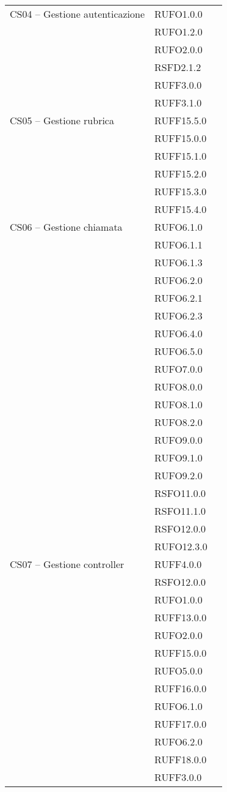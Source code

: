 \begin{center}
\begin{longtable}{lp{}l}
CS04 -- Gestione autenticazione & RUFO1.0.0 \\
 & RUFO1.2.0 \\
 & RUFO2.0.0 \\
 & RSFD2.1.2 \\
 & RUFF3.0.0 \\
 & RUFF3.1.0 \\
 
CS05 -- Gestione rubrica & RUFF15.5.0 \\
 & RUFF15.0.0 \\
 & RUFF15.1.0 \\
 & RUFF15.2.0 \\
 & RUFF15.3.0 \\
 & RUFF15.4.0 \\
 
CS06 -- Gestione chiamata
 & RUFO6.1.0 \\
 & RUFO6.1.1 \\
 & RUFO6.1.3 \\
 & RUFO6.2.0 \\
 & RUFO6.2.1 \\
 & RUFO6.2.3 \\
 & RUFO6.4.0 \\
 & RUFO6.5.0 \\
 & RUFO7.0.0 \\
 & RUFO8.0.0 \\
 & RUFO8.1.0 \\
 & RUFO8.2.0 \\
 & RUFO9.0.0 \\
 & RUFO9.1.0 \\
 & RUFO9.2.0 \\
 & RSFO11.0.0 \\
 & RSFO11.1.0 \\
 & RSFO12.0.0 \\
 & RUFO12.3.0 \\
 
CS07 -- Gestione controller & RUFF4.0.0 \\
 & RSFO12.0.0 \\
 & RUFO1.0.0 \\
 & RUFF13.0.0 \\
 & RUFO2.0.0 \\
 & RUFF15.0.0 \\
 & RUFO5.0.0 \\
 & RUFF16.0.0 \\
 & RUFO6.1.0 \\
 & RUFF17.0.0 \\
 & RUFO6.2.0 \\
 & RUFF18.0.0 \\
 & RUFF3.0.0 \\
 

\end{longtable}
\end{center}
